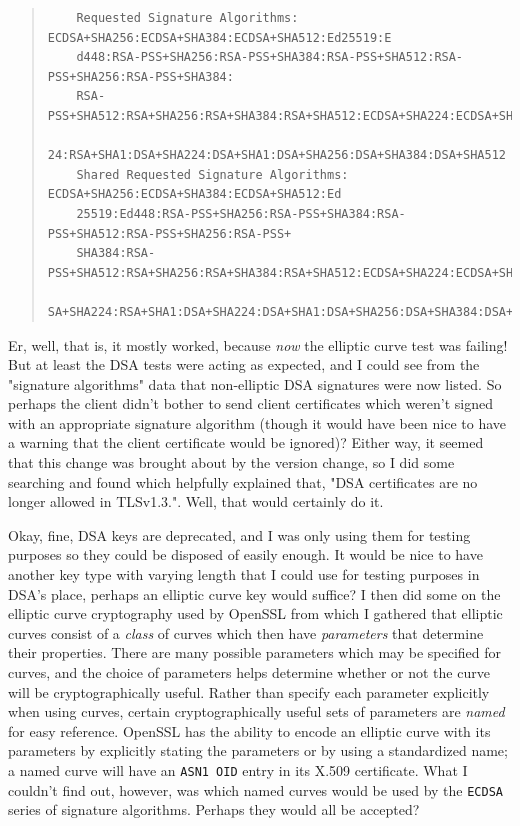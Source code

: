 \documentclass{article}
\begin{document}
\begin{quote}
\begin{verbatim}
	Requested Signature Algorithms: ECDSA+SHA256:ECDSA+SHA384:ECDSA+SHA512:Ed25519:E
	d448:RSA-PSS+SHA256:RSA-PSS+SHA384:RSA-PSS+SHA512:RSA-PSS+SHA256:RSA-PSS+SHA384:
	RSA-PSS+SHA512:RSA+SHA256:RSA+SHA384:RSA+SHA512:ECDSA+SHA224:ECDSA+SHA1:RSA+SHA2
	24:RSA+SHA1:DSA+SHA224:DSA+SHA1:DSA+SHA256:DSA+SHA384:DSA+SHA512
	Shared Requested Signature Algorithms: ECDSA+SHA256:ECDSA+SHA384:ECDSA+SHA512:Ed
	25519:Ed448:RSA-PSS+SHA256:RSA-PSS+SHA384:RSA-PSS+SHA512:RSA-PSS+SHA256:RSA-PSS+
	SHA384:RSA-PSS+SHA512:RSA+SHA256:RSA+SHA384:RSA+SHA512:ECDSA+SHA224:ECDSA+SHA1:R
	SA+SHA224:RSA+SHA1:DSA+SHA224:DSA+SHA1:DSA+SHA256:DSA+SHA384:DSA+SHA512
\end{verbatim}
\end{quote}

Er, well, that is, it mostly worked, because \emph{now} the elliptic curve test was failing!  But at least the DSA tests were acting as expected, and I could see from the "signature algorithms" data that non-elliptic DSA signatures were now listed.  So perhaps the client didn't bother to send client certificates which weren't signed with an appropriate signature algorithm (though it would have been nice to have a warning that the client certificate would be ignored)?  Either way, it seemed that this change was brought about by the version change, so I did some searching and found  which helpfully explained that, "DSA certificates are no longer allowed in TLSv1.3.".  Well, that would certainly do it.

Okay, fine, DSA keys are deprecated, and I was only using them for testing purposes so they could be disposed of easily enough.  It would be nice to have another key type with varying length that I could use for testing purposes in DSA's place, perhaps an elliptic curve key would suffice?  I then did some  on the elliptic curve cryptography used by OpenSSL from which I gathered that elliptic curves consist of a \emph{class} of curves which then have \emph{parameters} that determine their properties.  There are many possible parameters which may be specified for curves, and the choice of parameters helps determine whether or not the curve will be cryptographically useful.  Rather than specify each parameter explicitly when using curves, certain cryptographically useful sets of parameters are \emph{named} for easy reference.  OpenSSL has the ability to encode an elliptic curve with its parameters by explicitly stating the parameters or by using a standardized name; a named curve will have an \texttt{ASN1 OID} entry in its X.509 certificate.  What I couldn't find out, however, was which named curves would be used by the \texttt{ECDSA} series of signature algorithms.  Perhaps they would all be accepted?
\end{document}
